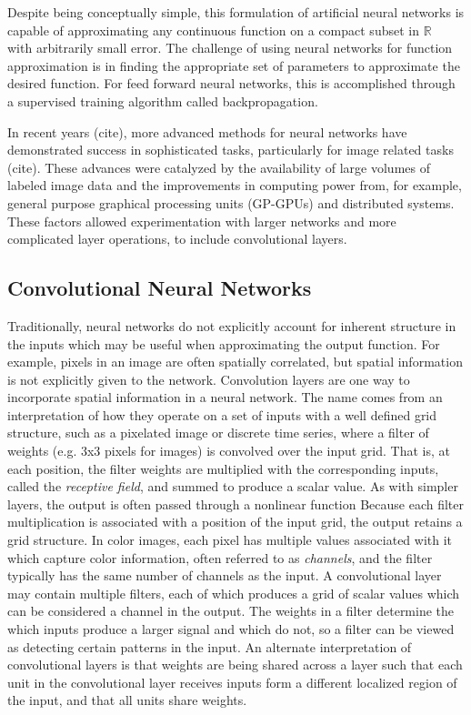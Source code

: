 Despite being conceptually simple, this formulation of artificial neural networks is capable of approximating any continuous function on a compact subset in $\mathbb{R}$~\cite{cybenko1989} with arbitrarily small error.
The challenge of using neural networks for function approximation is in finding the appropriate set of parameters to approximate the desired function. 
For feed forward neural networks, this is accomplished through a supervised training algorithm called backpropagation. 


In recent years (cite), more advanced methods for neural networks have demonstrated success in sophisticated tasks, particularly for image related tasks (cite). 
These advances were catalyzed by the availability of large volumes of labeled image data and the improvements in computing power from, for example, general purpose graphical processing units (GP-GPUs) and distributed systems.
These factors allowed experimentation with larger networks and more complicated layer operations, to include convolutional layers.


\subsection{Convolutional Neural Networks}

Traditionally, neural networks do not explicitly account for inherent structure in the inputs which may be useful when approximating the output function.
For example, pixels in an image are often spatially correlated, but spatial information is not explicitly given to the network.
Convolution layers are one way to incorporate spatial information in a neural network. 
The name comes from an interpretation of how they operate on a set of inputs with a well defined grid structure, such as a pixelated image or discrete time series, where a filter of weights (e.g. 3x3 pixels for images) is convolved over the input grid.
That is, at each position, the filter weights are multiplied with the corresponding inputs, called the \textit{receptive field}, and summed to produce a scalar value.
As with simpler layers, the output is often passed through a nonlinear function
Because each filter multiplication is associated with a position of the input grid, the output retains a grid structure. 
In color images, each pixel has multiple values associated with it which capture color information, often referred to as \textit{channels}, and the filter typically has the same number of channels as the input. 
A convolutional layer may contain multiple filters, each of which produces a grid of scalar values which can be considered a channel in the output.
The weights in a filter determine the which inputs produce a larger signal and which do not, so a filter can be viewed as detecting certain patterns in the input.
An alternate interpretation of convolutional layers is that weights are being shared across a layer such that each unit in the convolutional layer receives inputs form a different localized region of the input, and that all units share weights. 

